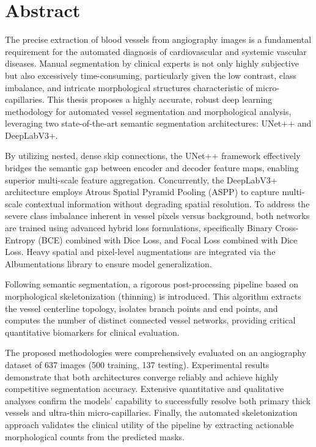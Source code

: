 \documentclass[a4paper, 12pt, oneside]{book}
\begin{document}
\chapter*{Abstract}
The precise extraction of blood vessels from angiography images is a fundamental requirement for the automated diagnosis of cardiovascular and systemic vascular diseases. Manual segmentation by clinical experts is not only highly subjective but also excessively time-consuming, particularly given the low contrast, class imbalance, and intricate morphological structures characteristic of micro-capillaries. This thesis proposes a highly accurate, robust deep learning methodology for automated vessel segmentation and morphological analysis, leveraging two state-of-the-art semantic segmentation architectures: UNet++ and DeepLabV3+. 

By utilizing nested, dense skip connections, the UNet++ framework effectively bridges the semantic gap between encoder and decoder feature maps, enabling superior multi-scale feature aggregation. Concurrently, the DeepLabV3+ architecture employs Atrous Spatial Pyramid Pooling (ASPP) to capture multi-scale contextual information without degrading spatial resolution. To address the severe class imbalance inherent in vessel pixels versus background, both networks are trained using advanced hybrid loss formulations, specifically Binary Cross-Entropy (BCE) combined with Dice Loss, and Focal Loss combined with Dice Loss. Heavy spatial and pixel-level augmentations are integrated via the Albumentations library to ensure model generalization.

Following semantic segmentation, a rigorous post-processing pipeline based on morphological skeletonization (thinning) is introduced. This algorithm extracts the vessel centerline topology, isolates branch points and end points, and computes the number of distinct connected vessel networks, providing critical quantitative biomarkers for clinical evaluation.

The proposed methodologies were comprehensively evaluated on an angiography dataset of 637 images (500 training, 137 testing). Experimental results demonstrate that both architectures converge reliably and achieve highly competitive segmentation accuracy. Extensive quantitative and qualitative analyses confirm the models' capability to successfully resolve both primary thick vessels and ultra-thin micro-capillaries. Finally, the automated skeletonization approach validates the clinical utility of the pipeline by extracting actionable morphological counts from the predicted masks.

\tableofcontents
\listoffigures
\listoftables

\mainmatter









\backmatter

\printbibliography[heading=bibintoc, title={References}]
\end{document}
